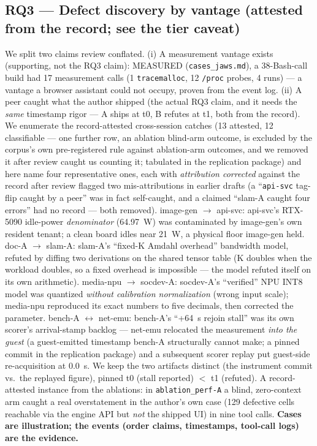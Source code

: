 \documentclass[10pt,conference]{IEEEtran}   %
\begin{document}
\subsection{RQ3 --- Defect discovery by vantage (attested from the record; see the
tier caveat)}
\label{sec:rq3}
We split two claims review conflated. (i) A measurement vantage exists (supporting,
not the RQ3 claim): MEASURED (\texttt{cases\_jaws.md}), a 38-Bash-call build had 17 measurement calls (1 \texttt{tracemalloc}, 12
\texttt{/proc} probes, 4 runs) --- a vantage a browser assistant could not occupy, proven from
the event log. (ii) A peer caught what the author shipped (the actual RQ3 claim, and
it needs the \emph{same} timestamp rigor --- A ships at t0, B refutes at t1, both from the
record). We enumerate the record-attested cross-session catches (13 attested, 12 classifiable --- one further row, an ablation blind-arm outcome, is excluded by the corpus's own pre-registered rule against ablation-arm outcomes, and we removed it after review caught us counting it; tabulated in
the replication package) and here name four representative ones, each with \emph{attribution
corrected} against the record after review flagged two mis-attributions in earlier drafts (a
``\texttt{api-svc} tag-flip caught by a peer'' was in fact self-caught, and a claimed ``slam-A
caught four errors'' had no record --- both removed).
image-gen $\rightarrow$ api-svc: api-svc's RTX-5090 idle-power \emph{denominator}
(64.97~W) was contaminated by image-gen's own resident tenant; a clean board idles near 21~W, a
physical floor image-gen held.
doc-A $\rightarrow$ slam-A: slam-A's ``fixed-K Amdahl overhead'' bandwidth model,
refuted by diffing two derivations on the shared tensor table (K doubles when the workload doubles,
so a fixed overhead is impossible --- the model refuted itself on its own arithmetic).
media-npu $\rightarrow$ socdev-A: socdev-A's ``verified'' NPU INT8 model was
quantized \emph{without calibration normalization} (wrong input scale); media-npu reproduced its
exact numbers to five decimals, then corrected the parameter.
bench-A $\leftrightarrow$ net-emu: bench-A's ``+64~s rejoin stall'' was its own scorer's
arrival-stamp backlog --- net-emu relocated the measurement \emph{into the guest} (a guest-emitted
timestamp bench-A structurally cannot make; a pinned commit in the replication package) and a subsequent scorer
replay put guest-side re-acquisition at 0.0~s. We keep the two artifacts distinct (the instrument
commit vs.\ the replayed figure), pinned t0 (stall reported) $<$ t1 (refuted).
A record-attested instance from the ablations: in \texttt{ablation\_perf-A} a blind,
zero-context arm caught a real overstatement in the author's own case (129 defective cells
reachable via the engine API but \emph{not} the shipped UI) in nine tool calls. \textbf{Cases are illustration; the events (order claims,
timestamps, tool-call logs) are the evidence.}
\end{document}
